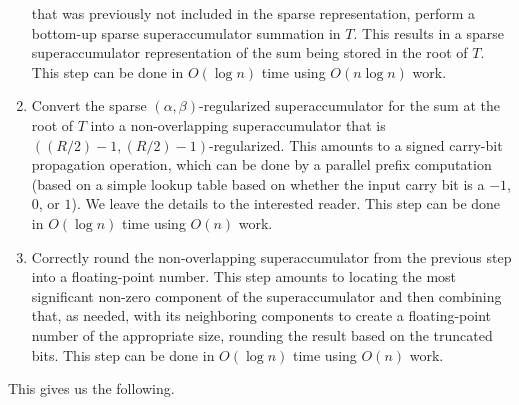 \documentclass[11pt]{article}
\begin{document}
\begin{enumerate}
that was previously not included in the sparse representation,
perform a bottom-up sparse superaccumulator summation in $T$. This
results in a sparse superaccumulator representation of the sum being
stored in the root of $T$.
This step can be done in $O(\log n)$ time using $O(n\log n)$ work.
\item
Convert the sparse $(\alpha,\beta)$-regularized superaccumulator for
the sum at the root of $T$ into a non-overlapping
superaccumulator that is
$((R/2)-1,(R/2)-1)$-regularized.
This amounts to a signed carry-bit propagation operation, which can be
done by a parallel prefix computation (based on a simple lookup
table based on whether the input carry bit is a $-1$, $0$, or $1$).
We leave the details to the interested reader.
This step can be done in $O(\log n)$ time using $O(n)$ work.
\item
Correctly round the non-overlapping
superaccumulator from the previous step
into a floating-point number.
This step amounts to locating the most significant non-zero component
of the superaccumulator and then combining that, as needed, 
with its neighboring components to create a floating-point number of 
the appropriate size, rounding the result based on the truncated bits.
This step can be done in $O(\log n)$ time using $O(n)$ work.
\end{enumerate}

This gives us the following.
\end{document}
